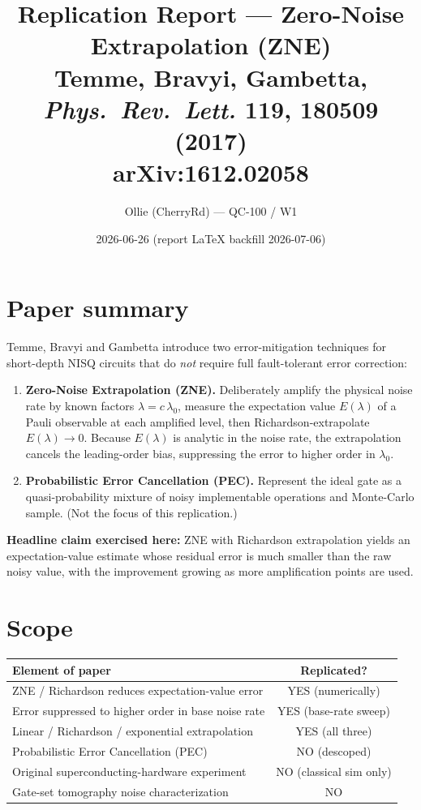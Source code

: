 \documentclass[11pt]{article}
\title{Replication Report --- Zero-Noise Extrapolation (ZNE)\\
\large Temme, Bravyi, Gambetta, \emph{Phys.\ Rev.\ Lett.} \textbf{119}, 180509 (2017)\\
arXiv:1612.02058}
\author{Ollie (CherryRd) --- QC-100 / W1}
\date{2026-06-26 (report \LaTeX{} backfill 2026-07-06)}
\begin{document}
\maketitle

\section{Paper summary}
Temme, Bravyi and Gambetta introduce two error-mitigation techniques for
short-depth NISQ circuits that do \emph{not} require full fault-tolerant
error correction:
\begin{enumerate}
  \item \textbf{Zero-Noise Extrapolation (ZNE).} Deliberately amplify the
        physical noise rate by known factors $\lambda = c\,\lambda_0$,
        measure the expectation value $E(\lambda)$ of a Pauli observable at
        each amplified level, then Richardson-extrapolate $E(\lambda)\to 0$.
        Because $E(\lambda)$ is analytic in the noise rate, the extrapolation
        cancels the leading-order bias, suppressing the error to higher
        order in $\lambda_0$.
  \item \textbf{Probabilistic Error Cancellation (PEC).} Represent the ideal
        gate as a quasi-probability mixture of noisy implementable operations
        and Monte-Carlo sample. (Not the focus of this replication.)
\end{enumerate}
\textbf{Headline claim exercised here:} ZNE with Richardson extrapolation
yields an expectation-value estimate whose residual error is much smaller
than the raw noisy value, with the improvement growing as more amplification
points are used.

\section{Scope}
\begin{center}
\begin{tabular}{@{}lc@{}}
\toprule
Element of paper & Replicated? \\
\midrule
ZNE / Richardson reduces expectation-value error       & YES (numerically) \\
Error suppressed to higher order in base noise rate    & YES (base-rate sweep) \\
Linear / Richardson / exponential extrapolation        & YES (all three) \\
Probabilistic Error Cancellation (PEC)                 & NO (descoped) \\
Original superconducting-hardware experiment           & NO (classical sim only) \\
Gate-set tomography noise characterization             & NO \\
\bottomrule
\end{tabular}
\end{center}
\end{document}
